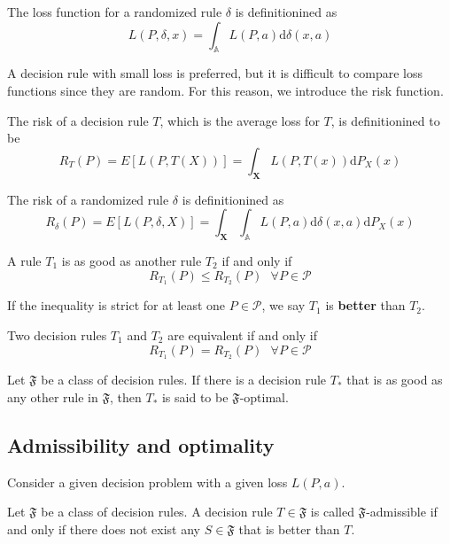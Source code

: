 \begin{remark}
The loss function for a randomized rule $\delta$ is definitionined as \[L(P,\delta,x)=\int_\mathbb{A}L(P,a)\mathrm{d}\delta(x,a)\]
\end{remark}
A decision rule with small loss is preferred, but it is difficult to compare loss functions since they are random. For this reason, we introduce the risk function.
\begin{definition}[risk]
The risk of a decision rule $T$, which is the average loss for $T$, is definitionined to be \[ R_T(P)=E[L(P,T(X))]=\int_\mathbf{X}L(P,T(x))\mathrm{d}P_X(x)\]
\end{definition}
\begin{remark}
The risk of a randomized rule $\delta$ is definitionined as \[R_\delta(P)=E[L(P,\delta,X)]=\int_\mathbf{X}\int_\mathbb{A}L(P,a)\mathrm{d}\delta(x,a)\mathrm{d}P_X(x)\]
\end{remark}
\begin{definition}[as good as]
A rule $T_1$ is as good as another rule $T_2$ if and only if \[R_{T_1}(P)\le R_{T_2}(P) \text{   } \forall P\in\mathcal{P}\]
\end{definition}
\begin{remark}
If the inequality is strict for at least one $P\in\mathcal{P}$, we say $T_1$ is \textbf{better} than $T_2$.
\end{remark}
\begin{definition}[equivalent]
Two decision rules $T_1$ and $T_2$ are equivalent if and only if \[R_{T_1}(P)= R_{T_2}(P) \text{   } \forall P\in\mathcal{P}\]
\end{definition}
\begin{definition}
Let $\mathfrak{F}$ be a class of decision rules. If there is a decision rule $T_*$ that is as good as any other rule in $\mathfrak{F}$, then $T_*$ is said to be $\mathfrak{F}$-optimal.
\end{definition}
\subsection{Admissibility and optimality}
Consider a given decision problem with a given loss $L(P,a)$.
\begin{definition}[admissibility]
Let $\mathfrak{F}$ be a class of decision rules. A decision rule $T\in\mathfrak{F}$ is called $\mathfrak{F}$-admissible if and only if there does not exist any $S\in\mathfrak{F}$ that is better than $T$.
\end{definition}

